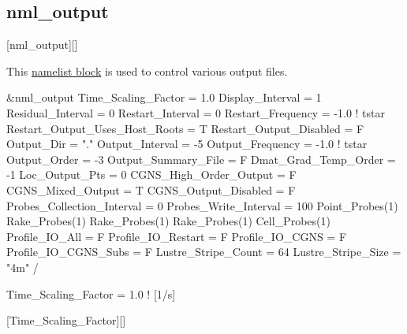 \subsection{nml\_output}
\label{SEC:nml_output}
\inp*[nmlOutput]{}[nml\_output][]

This \hyperref[SEC:User_Input]{namelist block}
is used to control various output files.

\begin{nmlblocklst}[
,label={LST:nml_output}
,caption={Namelist nml\_output.}
]
&nml_output
  Time_Scaling_Factor                =  1.0
  Display_Interval                   =  1
  Residual_Interval                  =  0
  Restart_Interval                   =  0
  Restart_Frequency                  = -1.0  ! tstar
  Restart_Output_Uses_Host_Roots     =  T
  Restart_Output_Disabled            =  F
  Output_Dir                         = "."
  Output_Interval                    = -5
  Output_Frequency                   = -1.0  ! tstar
  Output_Order                       = -3
  Output_Summary_File                =  F
  Dmat_Grad_Temp_Order               = -1
  Loc_Output_Pts                     =  0
  CGNS_High_Order_Output             =  F
  CGNS_Mixed_Output                  =  T
  CGNS_Output_Disabled               =  F
  Probes_Collection_Interval         =  0
  Probes_Write_Interval              =  100
  Point_Probes(1)%
  Rake_Probes(1)%
  Rake_Probes(1)%
  Rake_Probes(1)%
  Cell_Probes(1)%
  Profile_IO_All                     =  F
  Profile_IO_Restart                 =  F
  Profile_IO_CGNS                    =  F
  Profile_IO_CGNS_Subs               =  F
  Lustre_Stripe_Count                =  64
  Lustre_Stripe_Size                 = "4m"
/
\end{nmlblocklst}


\begin{nmldescitem}
Time_Scaling_Factor = 1.0  ! [1/s]
\end{nmldescitem}
[Time\_Scaling\_Factor][]


